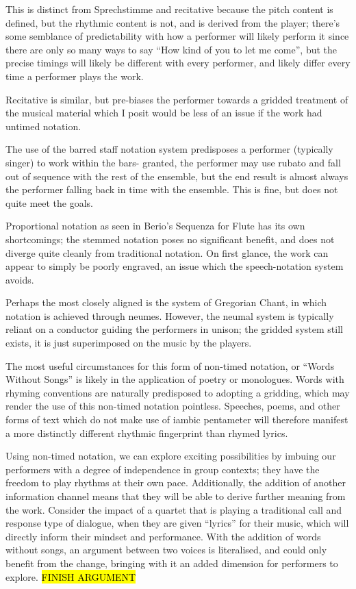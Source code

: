 This is distinct from Sprechstimme and recitative because the pitch content is defined, but the rhythmic content is not, and is derived from the player; 
there's some semblance of predictability with how a performer will likely perform it since there are only so many ways to say ``How kind of you to let me come'', but the precise timings will likely be different with every performer, and likely differ every time a performer plays the work. 

Recitative is similar, but pre-biases the performer towards a gridded treatment of the musical material which I posit would be less of an issue if the work had untimed notation. 

The use of the barred staff notation system predisposes a performer (typically singer) to work within the bars- granted, the performer may use rubato and fall out of sequence with the rest of the ensemble, but the end result is almost always the performer falling back in time with the ensemble. 
This is fine, but does not quite meet the goals.

Proportional notation as seen in Berio's Sequenza for Flute has its own shortcomings; the stemmed notation poses no significant benefit, and does not diverge quite cleanly from traditional notation. 
On first glance, the work can appear to simply be poorly engraved, an issue which the speech-notation system avoids.

Perhaps the most closely aligned is the system of Gregorian Chant, in which notation is achieved through neumes. 
However, the neumal system is typically reliant on a conductor guiding the performers in unison; the gridded system still exists, it is just superimposed on the music by the players.

The most useful circumstances for this form of non-timed notation, or ``Words Without Songs'' is likely in the application of poetry or monologues. 
Words with rhyming conventions are naturally predisposed to adopting a gridding, which may render the use of this non-timed notation pointless. 
Speeches, poems, and other forms of text which do not make use of iambic pentameter will therefore manifest a more distinctly different rhythmic fingerprint than rhymed lyrics. 

Using non-timed notation, we can explore exciting possibilities by imbuing our performers with a degree of independence in group contexts; 
they have the freedom to play rhythms at their own pace. 
Additionally, the addition of another information channel means that they will be able to derive further meaning from the work. 
Consider the impact of a quartet that is playing a traditional call and response type of dialogue, when they are given ``lyrics'' for their music, which will directly inform their mindset and performance. 
With the addition of words without songs, an argument between two voices is literalised, and could only benefit from the change, bringing with it an added dimension for performers to explore. \hl{FINISH ARGUMENT}


